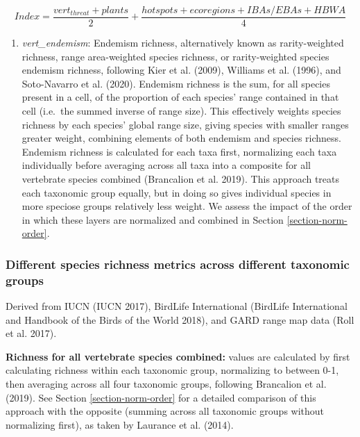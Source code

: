 \documentclass[
]{article}
\providecommand{\tightlist}{%
  \setlength{\itemsep}{0pt}\setlength{\parskip}{0pt}}
\begin{document}
\[ Index = \frac{vert_{threat} + plants}{2} + \frac{hotspots + ecoregions + IBAs/EBAs + HBWA}{4} \]

\begin{enumerate}
\def\labelenumi{(\arabic{enumi})}
\setcounter{enumi}{3}
\tightlist
\item
  \emph{vert\_endemism}: Endemism richness, alternatively known as rarity-weighted richness, range area-weighted species richness, or rarity-weighted species endemism richness, following Kier et al. (2009), Williams et al. (1996), and Soto-Navarro et al. (2020). Endemism richness is the sum, for all species present in a cell, of the proportion of each species' range contained in that cell (i.e.~the summed inverse of range size). This effectively weights species richness by each species' global range size, giving species with smaller ranges greater weight, combining elements of both endemism and species richness. Endemism richness is calculated for each taxa first, normalizing each taxa individually before averaging across all taxa into a composite for all vertebrate species combined (Brancalion et al. 2019). This approach treats each taxonomic group equally, but in doing so gives individual species in more speciose groups relatively less weight. We assess the impact of the order in which these layers are normalized and combined in Section \ref{section-norm-order}.
\end{enumerate}

\hypertarget{different-species-richness-metrics-across-different-taxonomic-groups}{%
\subsubsection{Different species richness metrics across different taxonomic groups}\label{different-species-richness-metrics-across-different-taxonomic-groups}}

Derived from IUCN (IUCN 2017), BirdLife International (BirdLife International and Handbook of the Birds of the World 2018), and GARD range map data (Roll et al. 2017).

\textbf{Richness for all vertebrate species combined:} values are calculated by first calculating richness within each taxonomic group, normalizing to between 0-1, then averaging across all four taxonomic groups, following Brancalion et al. (2019). See Section \ref{section-norm-order} for a detailed comparison of this approach with the opposite (summing across all taxonomic groups without normalizing first), as taken by Laurance et al. (2014).
\end{document}
